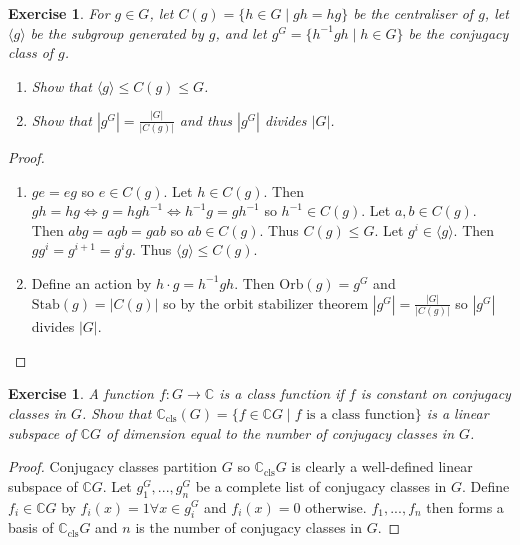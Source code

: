 \documentclass{article}
\newtheorem{exercise}[theorem]{Exercise}
\begin{document}
\begin{exercise}
    For \( g \in G \), let \( C(g) = \{h \in G \mid gh = hg\} \) be the centraliser of \( g \), let \(\langle g \rangle\) be the subgroup generated by \( g \), and let \( g^G = \{h^{-1}gh \mid h \in G\} \) be the conjugacy class of \( g \).
    \begin{enumerate}
        \item Show that \(\langle g \rangle \leq C(g) \leq G\).
        \item Show that \(|g^G| = \frac{|G|}{|C(g)|}\) and thus \(|g^G|\) divides \(|G|\).
    \end{enumerate}
\end{exercise}
\begin{proof}
\begin{enumerate}
    \item $ge=eg$ so $e\in C(g)$. Let $h\in C(g)$. Then $gh=hg\iff g=hgh^{-1}\iff h^{-1}g=gh^{-1}$ so $h^{-1}\in C(g)$. Let $a,b\in C(g)$. Then $abg=agb=gab$ so $ab\in C(g)$. Thus $C(g)\leq G$. Let $g^i\in\langle g\rangle$. Then $gg^i=g^{i+1}=g^ig$. Thus $\langle g\rangle\leq C(g)$.
    \item Define an action by $h\cdot g=h^{-1}gh$. Then $\text{Orb}(g)=g^G$ and $\text{Stab}(g)=|C(g)|$ so by the orbit stabilizer theorem $|g^G|=\frac{|G|}{|C(g)|}$ so $|g^G|$ divides $|G|$.
\end{enumerate}
\end{proof}
\begin{exercise}
    A function \( f : G \to \mathbb{C} \) is a \emph{class function} if \( f \) is constant on conjugacy classes in \( G \). Show that \( \mathbb{C}_{\text{cls}}(G) = \{f \in \mathbb{C}G \mid f \text{ is a class function}\} \) is a linear subspace of \( \mathbb{C}G \) of dimension equal to the number of conjugacy classes in \( G \).
\end{exercise}
\begin{proof}
Conjugacy classes partition $G$ so $\mathbb{C}_{\text{cls}}G$ is clearly a well-defined linear subspace of $\mathbb{C}G$. Let $g_1^G,...,g_n^G$ be a complete list of conjugacy classes in $G$. Define $f_i\in \mathbb{C}G$ by $f_i(x)=1\forall x\in g_i^G$ and $f_i(x)=0$ otherwise. $f_1,...,f_n$ then forms a basis of $\mathbb{C}_{\text{cls}}G$ and $n$ is the number of conjugacy classes in $G$.
\end{proof}
\end{document}
